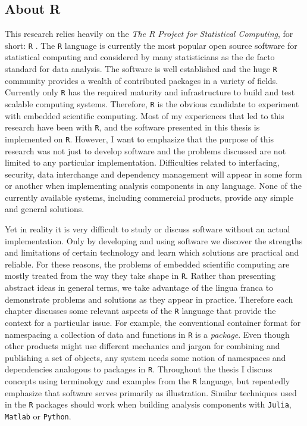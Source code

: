 \subsection{About R}

This research relies heavily on the \emph{The R Project for Statistical Computing}, for short: \texttt{R} \citep{R}. The \texttt{R} language is currently the most popular open source software for statistical computing and considered by many statisticians as the de facto standard for data analysis. The software is well established and the huge \texttt{R} community provides a wealth of contributed packages in a variety of fields. Currently only \texttt{R} has the required maturity and infrastructure to build and test scalable computing systems. Therefore, \texttt{R} is the obvious candidate to experiment with embedded scientific computing. Most of my experiences that led to this research have been with \texttt{R}, and the software presented in this thesis is implemented on \texttt{R}. However, I want to emphasize that the purpose of this research was not just to develop software and the problems discussed are not limited to any particular implementation. Difficulties related to interfacing, security, data interchange and dependency management will appear in some form or another when implementing analysis components in any language. None of the currently available systems, including commercial products, provide any simple and general solutions.

Yet in reality it is very difficult to study or discuss software without an actual implementation. Only by developing and using software we discover the strengths and limitations of certain technology and learn which solutions are practical and reliable. For these reasons, the problems of embedded scientific computing are mostly treated from the way they take shape in \texttt{R}. Rather than presenting abstract ideas in general terms, we take advantage of the lingua franca to demonstrate problems and solutions as they appear in practice. Therefore each chapter discusses some relevant aspects of the \texttt{R} language that provide the context for a particular issue. For example, the conventional container format for namespacing a collection of data and functions in \texttt{R} is a \emph{package}. Even though other products might use different mechanics and jargon for combining and publishing a set of objects, any system needs some notion of namespaces and dependencies analogous to packages in \texttt{R}. Throughout the thesis I discuss concepts using terminology and examples from the \texttt{R} language, but repeatedly emphasize that software serves primarily as illustration. Similar techniques used in the \texttt{R} packages should work when building analysis components with \texttt{Julia}, \texttt{Matlab} or \texttt{Python}. 

